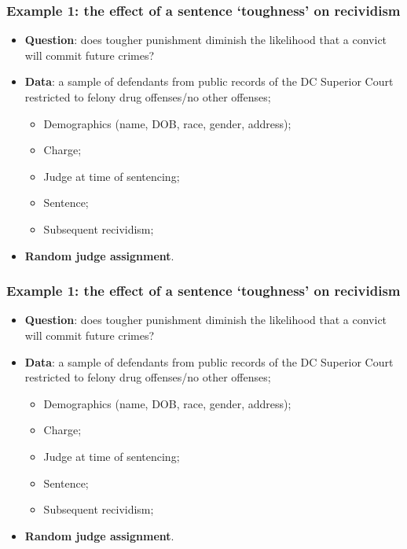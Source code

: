 \documentclass[aspectratio=169]{beamer}
\theoremstyle{principle}
\begin{document}
\begin{frame}
\frametitle{Example 1: the effect of a sentence `toughness' on recividism}

\begin{itemize}
\item \textbf{Question}: does tougher punishment diminish the likelihood that a convict will commit future crimes?
\bigskip
\bigskip

\item \textbf{Data}: a sample of defendants from public records of the DC Superior Court restricted to felony drug offenses/no other offenses;
\begin{itemize}
\item Demographics (name, DOB, race, gender, address);
\item Charge;
\item Judge at time of sentencing;
\item Sentence;
\item Subsequent recividism;
\end{itemize}
\bigskip
\bigskip

\item[]\color{white} \textbf{Random judge assignment}.
\end{itemize}

\end{frame}

\begin{frame}
\frametitle{Example 1: the effect of a sentence `toughness' on recividism}

\begin{itemize}
\item \textbf{Question}: does tougher punishment diminish the likelihood that a convict will commit future crimes?
\bigskip
\bigskip

\item \textbf{Data}: a sample of defendants from public records of the DC Superior Court restricted to felony drug offenses/no other offenses;
\begin{itemize}
\item Demographics (name, DOB, race, gender, address);
\item Charge;
\item Judge at time of sentencing;
\item Sentence;
\item Subsequent recividism;
\end{itemize}
\bigskip
\bigskip

\item \textbf{Random judge assignment}.
\end{itemize}

\end{frame}
\end{document}
